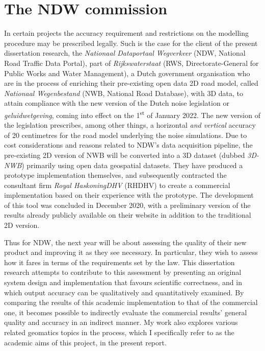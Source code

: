 \section{The NDW commission}
\label{sec:commission}

In certain projects the accuracy requirement and restrictions on the modelling procedure may be prescribed legally. Such is the case for the client of the present dissertation research, the \textit{Nationaal Dataportaal Wegverkeer} (NDW, National Road Traffic Data Portal), part of \textit{Rijkswaterstaat} (RWS, Directorate-General for Public Works and Water Management), a Dutch government organisation who are in the process of enriching their pre-existing open data 2D road model, called \textit{Nationaal Wegenbestand} (NWB, National Road Database), with 3D data, to attain compliance with the new version of the Dutch noise legislation or \textit{geluidwetgeving}, coming into effect on the 1\textsuperscript{st} of January 2022. The new version of the legislation prescribes, among other things, a horizontal \textit{and vertical} accuracy of 20 centimetres for the road model underlying the noise simulations. Due to cost considerations and reasons related to NDW’s data acquisition pipeline, the pre-existing 2D version of NWB will be converted into a 3D dataset (dubbed \textit{3D-NWB}) primarily using open data geospatial datasets. They have produced a prototype implementation themselves, and subsequently contracted the consultant firm \textit{Royal HaskoningDHV} (RHDHV) to create a commercial implementation based on their experience with the prototype. The development of this tool was concluded in December 2020, with a preliminary version of the results already publicly available on their website in addition to the traditional 2D version.

Thus for NDW, the next year will be about assessing the quality of their new product and improving it as they see necessary. In particular, they wish to assess how it fares in terms of the requirements set by the law. This dissertation research attempts to contribute to this assessment by presenting an original system design and implementation that favours scientific correctness, and in which output accuracy can be qualitatively and quantitatively examined. By comparing the results of this academic implementation to that of the commercial one, it becomes possible to indirectly evaluate the commercial results' general quality and accuracy in an indirect manner. My work also explores various related geomatics topics in the process, which I specifically refer to as the academic aims of this project, in the present report.

